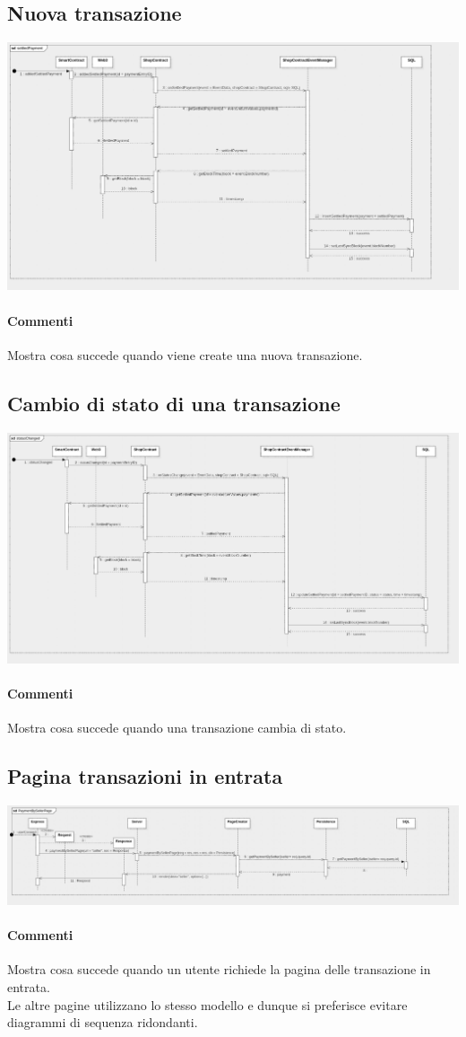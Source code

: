 \documentclass[a4paper, 12pt]{article}
\begin{document}
\subsection{Nuova transazione}
\includegraphics[width=1.0\textwidth]{settledPayment}
\paragraph{Commenti}
Mostra cosa succede quando viene create una nuova transazione.

\subsection{Cambio di stato di una transazione}
\includegraphics[width=1.0\textwidth]{statusChanged}
\paragraph{Commenti}
Mostra cosa succede quando una transazione cambia di stato.

\subsection{Pagina transazioni in entrata}
\includegraphics[width=1.0\textwidth]{paymentBySellerPage}
\paragraph{Commenti}
Mostra cosa succede quando un utente richiede la pagina delle transazione in entrata.\\
Le altre pagine utilizzano lo stesso modello e dunque si preferisce evitare diagrammi di sequenza ridondanti.
\end{document}
